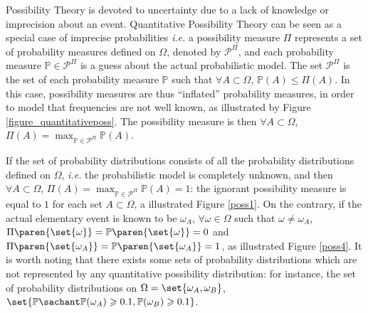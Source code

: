 Possibility Theory is devoted to uncertainty due to a lack of knowledge
or imprecision about an event.
Quantitative Possibility Theory can be seen as a special case of imprecise probabilities
\textit{i.e.} a possibility measure $\Pi$ represents a set of probability measures defined on $\Omega$,
denoted by $\mathcal{P}^{\Pi}$, and
each probability measure $\mathbb{P} \in \mathcal{P}^{\Pi}$ 
is a guess about the actual probabilistic model. 
The set $\mathcal{P}^{\Pi}$
is the set of each probability measure $\mathbb{P}$
such that $\forall A \subset \Omega$, $\mathbb{P}(A) \leqslant \Pi(A)$.
In this case, possibility measures are thus ``inflated'' probability measures,
in order to model that frequencies are not well known,
as illustrated by Figure \ref{figure_quantitativeposs}.
The possibility measure is then $\forall A \subset \Omega$, $\Pi(A) = \max_{\mathbb{P} \in \mathcal{P}^{\Pi}} \mathbb{P}(A)$.

If the set of probability distributions consists of 
all the probability distributions defined on $\Omega$,
\textit{i.e.} the probabilistic model is completely unknown,
and then $\forall A \subset \Omega$,
$\Pi(A) = \max_{\mathbb{P} \in \mathcal{P}^{\Pi}} \mathbb{P}(A) = 1$:
the ignorant possibility measure is equal to $1$ for each set $A \subset \Omega$,
a illustrated Figure \ref{poss1}.
On the contrary, if the actual elementary event is known to be $\omega_A$,
$\forall \omega \in \Omega$ such that $\omega \neq \omega_A$, $\Pi \paren{ \set{\omega} } = \mathbb{P} \paren{ \set{\omega} } = 0$
and  $\Pi \paren{ \set{\omega_A} } = \mathbb{P} \paren{ \set{\omega_A} } = 1$,
as illustrated Figure \ref{poss4}.
It is worth noting that there exists some sets of probability distributions
which are not represented by any quantitative possibility distribution:
for instance, the set of probability distributions on $\Omega = \set{\omega_A,\omega_B}$,
$\set{ \mathbb{P} \sachant \mathbb{P}(\omega_A) \geqslant 0.1, \mathbb{P}(\omega_B) \geqslant 0.1  }$.

